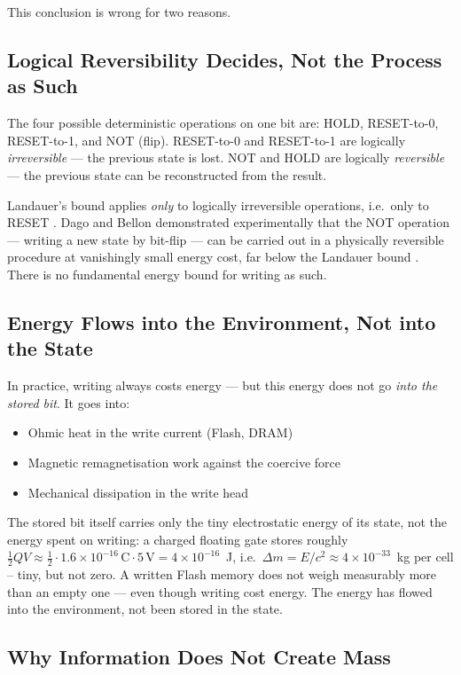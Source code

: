 This conclusion is wrong for two reasons.

\subsection{Logical Reversibility Decides, Not the Process as Such}

The four possible deterministic operations on one bit are: HOLD, RESET-to-0,
RESET-to-1, and NOT (flip). RESET-to-0 and RESET-to-1 are logically
\emph{irreversible} — the previous state is lost. NOT and HOLD are logically
\emph{reversible} — the previous state can be reconstructed from the result.

Landauer's bound applies \emph{only} to logically irreversible operations,
i.e.\ only to RESET \cite{Landauer1961}. Dago and Bellon demonstrated
experimentally that the NOT operation — writing a new state by bit-flip —
can be carried out in a physically reversible procedure at vanishingly small
energy cost, far below the Landauer bound \cite{Dago2023}. There is no
fundamental energy bound for writing as such.

\subsection{Energy Flows into the Environment, Not into the State}

In practice, writing always costs energy — but this energy does not go
\emph{into the stored bit}. It goes into:

\begin{itemize}
  \item Ohmic heat in the write current (Flash, DRAM)
  \item Magnetic remagnetisation work against the coercive force
  \item Mechanical dissipation in the write head
\end{itemize}

The stored bit itself carries only the tiny electrostatic energy of its
state, not the energy spent on writing: a charged floating gate stores roughly
$\tfrac12 QV \approx \tfrac12\cdot1.6\times10^{-16}\,\text{C}\cdot5\,\text{V} = 4\times10^{-16}$~J,
i.e.\ $\Delta m = E/c^2 \approx 4\times10^{-33}$~kg per cell -- tiny, but not zero.
A written Flash memory does not weigh measurably more than an empty one — even though writing
cost energy. The energy has flowed into the environment, not been stored
in the state.

\subsection{Why Information Does Not Create Mass}

